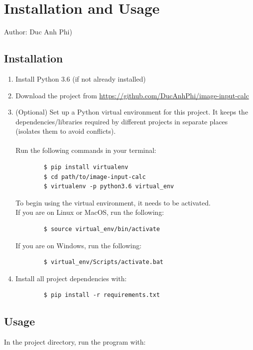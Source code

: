 \documentclass[12pt]{article}
\begin{document}
	\section{Installation and Usage}
	\small{Author: Duc Anh Phi)\\
	\subsection{Installation}
	
	\begin{enumerate}
		\item Install Python 3.6 (if not already installed)
		\item Download the project from \url{https://github.com/DucAnhPhi/image-input-calc}
		\item (Optional) Set up a Python virtual environment for this project. It keeps the dependencies/libraries required by different projects in separate places (isolates them to avoid conflicts). \\
		\\
		Run the following commands in your terminal:
		\begin{verbatim}
		$ pip install virtualenv
		$ cd path/to/image-input-calc
		$ virtualenv -p python3.6 virtual_env
		\end{verbatim}
		To begin using the virtual environment, it needs to be activated.
		\\
		If you are on Linux or MacOS, run the following:

		\begin{verbatim}
		$ source virtual_env/bin/activate
		\end{verbatim}

		If you are on Windows, run the following:

		\begin{verbatim}
		$ virtual_env/Scripts/activate.bat
		\end{verbatim}

		\item Install all project dependencies with:
		\begin{verbatim}
		$ pip install -r requirements.txt
		\end{verbatim}
	\end{enumerate}




\subsection{Usage}
In the project directory, run the program with:

}
\end{document}

